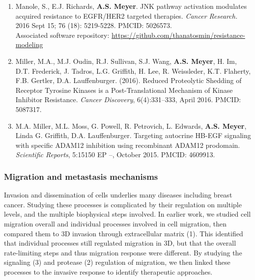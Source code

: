 \documentclass[11pt]{article}
\begin{document}
\begin{enumerate}
  \item Manole, S., E.J. Richards, {\bf A.S. Meyer}. JNK pathway activation modulates acquired resistance to EGFR/HER2 targeted therapies. {\sl Cancer Research.} 2016 Sept 15; 76 (18): 5219-5228. PMCID: 5026573.\\ Associated software repository: \url{https://github.com/thanatosmin/resistance-modeling}
  \item Miller, M.A., M.J. Oudin, R.J. Sullivan, S.J. Wang, \textbf{A.S. Meyer}, H. Im, D.T. Frederick, J. Tadros, L.G. Griffith, H. Lee, R. Weissleder, K.T. Flaherty, F.B. Gertler, D.A. Lauffenburger. (2016). Reduced Proteolytic Shedding of Receptor Tyrosine Kinases is a Post-Translational Mechanism of Kinase Inhibitor Resistance. \emph{Cancer Discovery}, 6(4):331--333, April 2016. PMCID: 5087317.
  \item M.A. Miller, M.L. Moss, G. Powell, R. Petrovich, L. Edwards, \textbf{A.S. Meyer}, Linda G. Griffith, D.A. Lauffenburger. Targeting autocrine HB-EGF signaling with specific ADAM12 inhibition using recombinant ADAM12 prodomain. \emph{Scientific Reports}, 5:15150 EP --, October 2015. PMCID: 4609913.
\end{enumerate}





\subsubsection{Migration and metastasis mechanisms}

Invasion and dissemination of cells underlies many diseases including breast cancer. Studying these processes is complicated by their regulation on multiple levels, and the multiple biophysical steps involved. In earlier work, we studied cell migration overall and individual processes involved in cell migration, then compared them to 3D invasion through extracellular matrix (1). This identified that individual processes still regulated migration in 3D, but that the overall rate-limiting steps and thus migration response were different. By studying the signaling (3) and protease (2) regulation of migration, we then linked these processes to the invasive response to identify therapeutic approaches.
\end{document}
